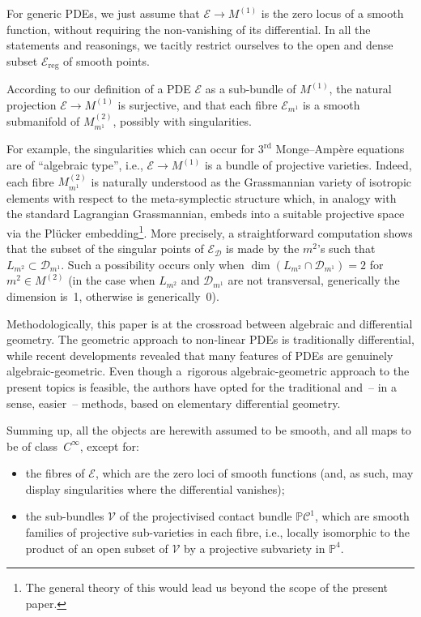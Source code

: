 \documentclass[pdftex]{sigma}
\newcommand{\C}{\mathcal{C}}
\newcommand{\D}{\mathcal{D}}
\newcommand{\M}{\mathcal{V}}
\newcommand{\E}{\mathcal{E}}
\renewcommand{\P}{\mathbb{P}}
\newcommand{\Rd}{^\textrm{rd}}
\numberwithin{equation}{section}
\begin{document}
For generic PDEs, we just assume that $\E\longrightarrow M^{(1)}$ is the zero locus of a smooth function, without requiring the non-vanishing of its dif\/ferential. In all the statements and reasonings, we tacitly restrict ourselves to the open and dense subset $\E_{\textrm{reg}}$ of smooth points.

According to our def\/inition of a PDE $\E$ as a sub-bundle of $M^{(1)}$, the natural projection $\E\longrightarrow M^{(1)}$ is surjective,
 and that each f\/ibre $\E_{m^1}$ is a smooth submanifold of $M^{(2)}_{m^1}$, possibly with singularities.

For example, the singularities which can occur for $3\Rd$ Monge--Amp\`ere equations are of ``algebraic type'', i.e., $\E\longrightarrow M^{(1)}$ is a bundle of projective varieties. Indeed, each f\/ibre $M^{(2)}_{m^1}$ is naturally understood as the Grassmannian variety of isotropic elements with respect to the meta-symplectic structure which, in analogy with the standard Lagrangian Grassmannian, embeds into a suitable projective space via the Pl\"ucker embedding\footnote{The general theory of this would lead us beyond the scope of the present paper.}. More precisely, a straightforward computation shows that the subset of the singular points of $\E_\D$ is made by the $m^2$'s such that $L_{m^2}\subset\D_{m^1}$. Such a possibility occurs only when $\dim(L_{m^2}\cap\D_{m^1})=2$ for $m^2\in M^{(2)}$ (in the case when $L_{m^2}$ and $\D_{m^1}$ are not transversal, generically the dimension is~1, otherwise is generically~0).

Methodologically, this paper is at the crossroad between algebraic and dif\/ferential geometry. The geometric approach to non-linear PDEs is traditionally dif\/ferential, while recent developments revealed that many features of PDEs are genuinely algebraic-geometric. Even though a~rigorous algebraic-geometric approach to the present topics is feasible, the authors have opted for the traditional and~-- in a sense, easier~-- methods, based on elementary dif\/ferential geometry.

Summing up, all the objects are herewith assumed to be smooth, and all maps to be of class~$C^\infty$, except for:
\begin{itemize}\itemsep=0pt
\item the f\/ibres of $\E$, which are the zero loci of smooth functions (and, as such, may display singularities where the dif\/ferential vanishes);
\item the sub-bundles $\M$ of the projectivised contact bundle $\P\C^1$, which are smooth families of projective sub-varieties in each f\/ibre, i.e., locally isomorphic to the product of an open subset of $\M$ by a projective subvariety in $\P^4$.
\end{itemize}
\end{document}
